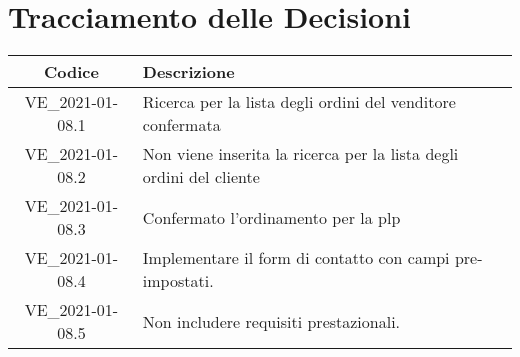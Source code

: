 \section*{Tracciamento delle Decisioni}

\begin{center}
	\begin{longtable}{|c|p{11.5cm}|}
	\hline
	\rowcolor{lighter-grayer}
	\textbf{Codice} & \textbf{Descrizione} \\
	\hline
	\endfirsthead

	\hline
	VE\_2021-01-08.1 & Ricerca per la lista degli ordini del venditore confermata \\
	VE\_2021-01-08.2 & Non viene inserita la ricerca per la lista degli ordini del cliente \\
	VE\_2021-01-08.3 & Confermato l'ordinamento per la plp \\
	VE\_2021-01-08.4 & Implementare il form di contatto con campi pre-impostati. \\
	VE\_2021-01-08.5 & Non includere requisiti prestazionali. \\
	\hline

	\end{longtable}
\end{center}